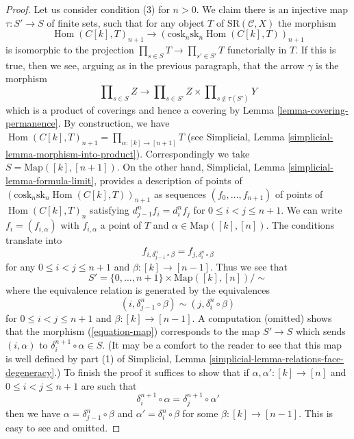 \documentclass{stacks-project}
\theoremstyle{plain}
\theoremstyle{definition}
\theoremstyle{remark}
\numberwithin{equation}{subsection}
\def\Hom{\mathop{\mathrm{Hom}}\nolimits}
\begin{document}
\begin{proof}
\medskip\noindent
Let us consider condition (3) for $n > 0$. We claim there is an
injective map $\tau : S' \to S$ of finite sets, such that for any
object $T$ of $\text{SR}(\mathcal{C}, X)$ the morphism
\begin{equation}
\label{equation-map}
\Hom(C[k], T)_{n + 1} \to
(\text{cosk}_n \text{sk}_n \Hom(C[k], T))_{n + 1}
\end{equation}
is isomorphic to the projection $\prod_{s \in S} T \to \prod_{s' \in S'} T$
functorially in $T$. If this is true, then we see, arguing as in the previous
paragraph, that the arrow $\gamma$ is the morphism
$$
\prod\nolimits_{s \in S} Z
\longrightarrow
\prod\nolimits_{s \in S'} Z
\times
\prod\nolimits_{s \not\in \tau(S')} Y
$$
which is a product of coverings and hence a covering by
Lemma \ref{lemma-covering-permanence}. By construction, we have
$\Hom(C[k], T)_{n + 1} = \prod_{\alpha : [k] \to [n + 1]} T$
(see Simplicial, Lemma \ref{simplicial-lemma-morphism-into-product}).
Correspondingly we take $S = \text{Map}([k], [n + 1])$.
On the other hand, Simplicial, Lemma \ref{simplicial-lemma-formula-limit},
provides a description of points of
$(\text{cosk}_n \text{sk}_n \Hom(C[k], T))_{n + 1}$
as sequences $(f_0, \ldots, f_{n + 1})$ of points of $\Hom(C[k], T)_n$
satisfying $d^n_{j - 1} f_i = d^n_i f_j$ for $0 \leq i < j \leq n + 1$.
We can write $f_i = (f_{i, \alpha})$ with $f_{i, \alpha}$ a point of $T$
and $\alpha \in \text{Map}([k], [n])$. The conditions translate into
$$
f_{i, \delta^n_{j - 1} \circ \beta} = f_{j, \delta_i^n \circ \beta}
$$
for any $0 \leq i < j \leq n + 1$ and $\beta : [k] \to [n - 1]$. Thus we
see that
$$
S' = \{0, \ldots, n + 1\} \times \text{Map}([k], [n]) / \sim
$$
where the equivalence relation is generated by the equivalences
$$
(i, \delta^n_{j - 1} \circ \beta) \sim (j, \delta_i^n \circ \beta)
$$
for $0 \leq i < j \leq n + 1$ and $\beta : [k] \to [n - 1]$.
A computation (omitted) shows that the morphism (\ref{equation-map})
corresponds to the map $S' \to S$ which sends $(i, \alpha)$ to
$\delta^{n + 1}_i \circ \alpha \in S$. (It may be a comfort to the
reader to see that this map is well defined by part (1) of
Simplicial, Lemma \ref{simplicial-lemma-relations-face-degeneracy}.)
To finish the proof it suffices to show that if
$\alpha, \alpha' : [k] \to [n]$ and $0 \leq i < j \leq n + 1$
are such that
$$
\delta^{n + 1}_i \circ \alpha = \delta^{n + 1}_j \circ \alpha'
$$
then we have $\alpha = \delta^n_{j - 1} \circ \beta$
and $\alpha' = \delta_i^n \circ \beta$ for some $\beta : [k] \to [n - 1]$.
This is easy to see and omitted.
\end{proof}
\end{document}
